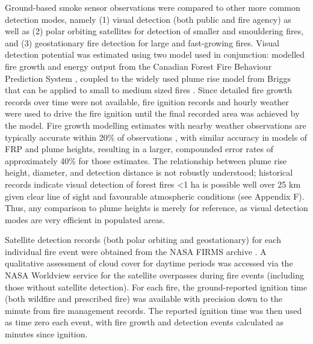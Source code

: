 \documentclass[fire,article,submit,moreauthors]{mdpi}
\begin{document}
Ground-based smoke sensor observations were compared to other more
common detection modes, namely (1) visual detection (both public and
fire agency) as well as (2) polar orbiting satellites for detection of
smaller and smouldering fires, and (3) geostationary fire detection for
large and fast-growing fires. Visual detection potential was estimated
using two model used in conjunction: modelled fire growth and energy
output from the Canadian Forest Fire Behaviour Prediction System
\citep{forestrycanadafiredangerratinggroup1992}, coupled to the widely
used plume rise model from Briggs that can be applied to small to medium
sized fires \citep{tory2018}. Since detailed fire growth records over
time were not available, fire ignition records and hourly weather were
used to drive the fire ignition until the final recorded area was
achieved by the model. Fire growth modelling estimates with nearby
weather observations are typically accurate within 20\% of observations
\citep{taylor2018}, with similar accuracy in models of FRP and plume
heights, resulting in a larger, compounded error rates of approximately
40\% for those estimates. The relationship between plume rise height,
diameter, and detection distance is not robustly understood; historical
records indicate visual detection of forest fires \textless1 ha is
possible well over 25 km given clear line of sight and favourable
atmospheric conditions (see Appendix F). Thus, any comparison to plume
heights is merely for reference, as visual detection modes are very
efficient in populated areas.

Satellite detection records (both polar orbiting and geostationary) for
each individual fire event were obtained from the NASA FIRMS archive
\citep{hewson2024}. A qualitative assessment of cloud cover for daytime
periods was accessed via the NASA Worldview service for the satellite
overpasses during fire events (including those without satellite
detection). For each fire, the ground-reported ignition time (both
wildfire and prescribed fire) was available with precision down to the
minute from fire management records. The reported ignition time was then
used as time zero each event, with fire growth and detection events
calculated as minutes since ignition.
\end{document}
